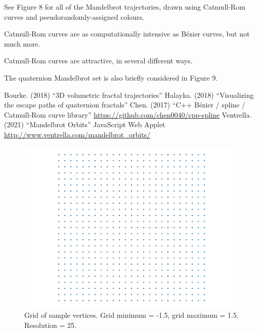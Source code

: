 \documentclass[12pt]{article}
\begin{document}
See Figure 8 for all of the Mandelbrot trajectories, drawn using Catmull-Rom curves and pseudorandomly-assigned colours.

Catmull-Rom curves are as computationally intensive as B\'ezier curves, but not much more.

Catmull-Rom curves are attractive, in several different ways.

The quaternion Mandelbrot set is also briefly considered in Figure 9.






\begin{thebibliography}{9}
 Bourke. (2018) ``3D volumetric fractal trajectories''
 Halayka. (2018) ``Visualizing the escape paths of quaternion fractals''
 Chen. (2017) ``C++ B\'ezier / spline / Catmull-Rom curve library'' \linebreak \url{https://github.com/chen0040/cpp-spline}
 Ventrella. (2021) ``Mandelbrot Orbits'' JavaScript Web Applet \linebreak \url{http://www.ventrella.com/mandelbrot_orbits/}



\end{thebibliography}



\pagebreak

\begin{figure} 
\centering
  \includegraphics[width = 5 in]{grid.png}	
  \caption{Grid of sample vertices.
Grid minimum = -1.5, grid maximum = 1.5.
Resolution = 25.
}
\end{figure}
\end{document}

